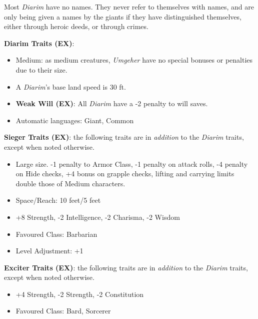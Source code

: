 Most \emph{Diarim} have no names. They never refer to themselves with names,
and are only being given a names by the giants if they have distinguished
themselves, either through heroic deeds, or through crimes.

\begin{35e}
  \textbf{Diarim Traits (EX)}:
  \begin{itemize}[noitemsep]
    \item Medium: as medium creatures, \emph{Umgeher} have no special bonuses or
    penalties due to their size.
    \item A \emph{Diarim}'s base land speed is 30 ft.
    \item \textbf{Weak Will (EX)}: All \emph{Diarim} have a -2 penalty to will
    saves.
    \item Automatic languages: Giant, Common
  \end{itemize}

  \textbf{Sieger Traits (EX)}: the following traits are in \emph{addition} to
  the \emph{Diarim} traits, except when noted otherwise.
  \begin{itemize}[noitemsep]
    \item Large size. -1 penalty to Armor Class, -1 penalty on attack rolls,
    -4 penalty on Hide checks, +4 bonus on grapple checks, lifting and
    carrying limits double those of Medium characters.
    \item Space/Reach: 10 feet/5 feet
    \item +8 Strength, -2 Intelligence, -2 Charisma, -2 Wisdom
    \item Favoured Class: Barbarian
    \item Level Adjustment: +1
  \end{itemize}

  \textbf{Exciter Traits (EX)}: the following traits are in \emph{addition} to
  the \emph{Diarim} traits, except when noted otherwise.
  \begin{itemize}[noitemsep]
    \item +4 Strength, -2 Strength, -2 Constitution
    \item Favoured Class: Bard, Sorcerer
  \end{itemize}
\end{35e}
